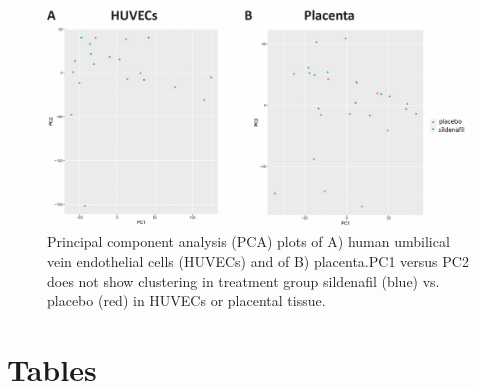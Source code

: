 \documentclass[authordate, empirical]{jote-new-article}
\begin{document}
\begin{figure}[h!]
  \includegraphics[width=\linewidth]{media/image1.jpeg}

  \caption{Principal component analysis (PCA) plots of A) human umbilical vein endothelial cells (HUVECs) and of B) placenta.PC1 versus PC2 does not show clustering in treatment group sildenafil (blue) vs. placebo (red) in HUVECs or placental tissue.}

  \label{fig:rId8}


\end{figure}





\newpage

\section{Tables}
\end{document}
